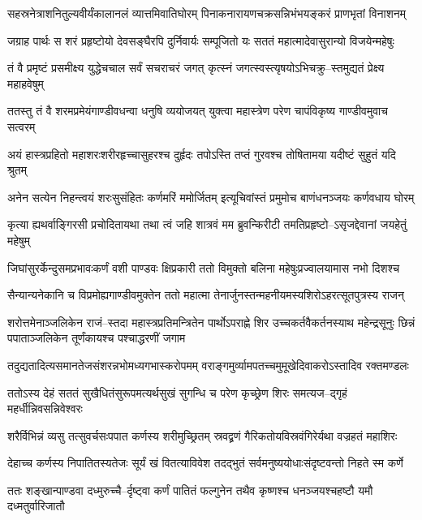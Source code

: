 \twolineshloka
{सहस्रनेत्राशनितुल्यवीर्यंकालानलं व्यात्तमिवातिघोरम्}
{पिनाकनारायणचक्रसन्निभंभयङ्करं प्राणभृतां विनाशनम्}


\twolineshloka
{जग्राह पार्थः स शरं प्रहृष्टोयो देवसङ्घैरपि दुर्निवार्यः}
{सम्पूजितो यः सततं महात्मादेवासुरान्यो विजयेन्महेषुः}


\twolineshloka
{तं वै प्रमृष्टं प्रसमीक्ष्य युद्धेचचाल सर्वं सचराचरं जगत्}
{कृत्स्नं जगत्स्वस्त्यृषयोऽभिचक्रु--स्तमुद्यतं प्रेक्ष्य महाहवेषुम्}


\twolineshloka
{ततस्तु तं वै शरमप्रमेयंगाण्डीवधन्वा धनुषि व्ययोजयत्}
{युक्त्वा महास्त्रेण परेण चापंविकृष्य गाण्डीवमुवाच सत्वरम्}


\twolineshloka
{अयं हास्त्रप्रहितो महाशरःशरीरहृच्चासुहरश्च दुर्हृदः}
{तपोऽस्ति तप्तं गुरवश्च तोषितामया यदीष्टं सुहुतं यदि श्रुतम्}


\twolineshloka
{अनेन सत्येन निहन्त्वयं शरःसुसंहितः कर्णमरिं ममोर्जितम्}
{इत्यूचिवांस्तं प्रमुमोच बाणंधनञ्जयः कर्णवधाय घोरम्}


\twolineshloka
{कृत्या ह्यथर्वाङ्गिरसी प्रचोदितायथा तथा त्वं जहि शात्रवं मम}
{ब्रुवन्किरीटी तमतिप्रहृष्टो--ऽसृजद्देवानां जयहेतुं महेषुम्}


\twolineshloka
{जिघांसुरर्केन्दुसमप्रभावःकर्णं वशी पाण्डवः क्षिप्रकारी}
{ततो विमुक्तो बलिना महेषुःप्रज्वालयामास नभो दिशश्च}


\twolineshloka
{सैन्यान्यनेकानि च विप्रमोह्यगाण्डीवमुक्तेन ततो महात्मा}
{तेनार्जुनस्तन्महनीयमस्यशिरोऽहरत्सूतपुत्रस्य राजन्}


\threelineshloka
{शरोत्तमेनाञ्जलिकेन राजं--स्तदा महास्त्रप्रतिमन्त्रितेन}
{पार्थोऽपराह्णे शिर उच्चकर्तवैकर्तनस्याथ महेन्द्रसूनुः}
{छिन्नं पपाताञ्जलिकेन तूर्णंकायश्च पश्चाद्धरणीं जगाम}


\twolineshloka
{तदुद्यतादित्यसमानतेजसंशरन्नभोमध्यगभास्करोपमम्}
{वराङ्गमुर्व्यामपतच्चमुमूखेदिवाकरोऽस्तादिव रक्तमण्डलः}


\twolineshloka
{ततोऽस्य देहं सततं सुखैधितंसुरूपमत्यर्थसुखं सुगन्धि च}
{परेण कृच्छ्रेण शिरः समत्यज--द्गृहं महर्धीन्निवसन्निवेश्वरः}


\twolineshloka
{शरैर्विभिन्नं व्यसु तत्सुवर्चसःपपात कर्णस्य शरीमुच्छ्रितम्}
{स्रवद्व्रणं गैरिकतोयविस्रवंगिरेर्यथा वज्रहतं महाशिरः}


\twolineshloka
{देहाच्च कर्णस्य निपातितस्यतेजः सूर्यं खं वितत्याविवेश}
{तदद्भुतं सर्वमनुष्ययोधाःसंदृष्टवन्तो निहते स्म कर्णे}


\twolineshloka
{ततः शङ्खान्पाण्डवा दध्मुरुच्चै--र्दृष्ट्वा कर्णं पातितं फल्गुनेन}
{तथैव कृष्णश्च धनञ्जयश्चहष्टौ यमौ दध्मतुर्वारिजातौ}


